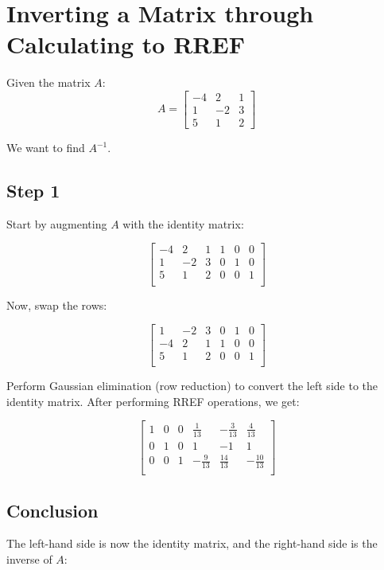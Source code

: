 \documentclass{article}
\begin{document}
\section*{Inverting a Matrix through Calculating to RREF}

Given the matrix $A$:
\[
A = \begin{bmatrix}
-4 & 2 & 1 \\
1 & -2 & 3 \\
5 & 1 & 2
\end{bmatrix}
\]

We want to find $A^{-1}$.

\subsection*{Step 1}
Start by augmenting $A$ with the identity matrix:

\[
\left[\begin{array}{ccc|ccc}
-4 & 2 & 1 & 1 & 0 & 0 \\
1 & -2 & 3 & 0 & 1 & 0 \\
5 & 1 & 2 & 0 & 0 & 1 \\
\end{array}\right]
\]

Now, swap the rows:

\[
\left[\begin{array}{ccc|ccc}
1 & -2 & 3 & 0 & 1 & 0 \\
-4 & 2 & 1 & 1 & 0 & 0 \\
5 & 1 & 2 & 0 & 0 & 1 \\
\end{array}\right]
\]

Perform Gaussian elimination (row reduction) to convert the left side to the identity matrix. After performing RREF operations, we get:

\[
\left[\begin{array}{ccc|ccc}
1 & 0 & 0 & \frac{1}{13} & -\frac{3}{13} & \frac{4}{13} \\
0 & 1 & 0 & 1 & -1 & 1 \\
0 & 0 & 1 & -\frac{9}{13} & \frac{14}{13} & -\frac{10}{13} \\
\end{array}\right]
\]

\subsection*{Conclusion}
The left-hand side is now the identity matrix, and the right-hand side is the inverse of $A$:
\end{document}
